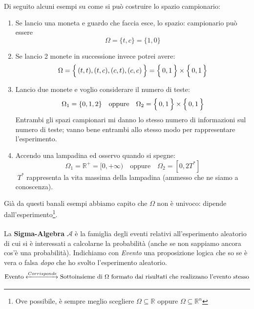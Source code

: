 \begin{esempio}
Di seguito alcuni esempi su come si può costruire lo spazio campionario:
\begin{enumerate}
    \item  Se lancio una moneta e guardo che faccia esce, lo spazio:
    campionario può essere \[\Omega = \{t, c\} = \{1, 0\}\]
    \item Se lancio 2 monete in successione invece potrei avere: 
    \[\Omega = \Bigl\{\,(t, t), (t, c), (c, t), (c, c)\,\Bigr\} = \Bigl\{\,0, 1\,\Bigr\} \times \Bigl\{\,0, 1\,\Bigr\}\]
    \item Lancio due monete e voglio considerare il numero di teste:
    \[\Omega_1 = \{0, 1, 2\} \quad \text{oppure} \quad \Omega_2 = \Bigl\{\,0, 1\,\Bigr\} \times \Bigl\{\,0, 1\,\Bigr\}\] 
    Entrambi gli spazi campionari mi danno lo stesso numero di informazioni sul numero di teste; vanno bene entrambi allo stesso modo per rappresentare l'esperimento.
    \item Accendo una lampadina ed osservo quando si spegne:
    \[\Omega_1 = \mathbb{R}^+ = [0, +\infty) \quad \text{oppure} \quad \Omega_2 = [0, 2T^*]\]
    $\;T^*$ rappresenta la vita massima della lampadina (ammesso che ne siamo a conoscenza).
\end{enumerate}
\end{esempio}
Già da questi banali esempi abbiamo capito che $\Omega$ non è univoco: dipende dall'esperimento\footnote{Ove possibile, è sempre meglio scegliere $\Omega \subseteq \mathbb{R}$ oppure $\Omega \subseteq \mathbb{R}^n$}.\\
\\
La \textbf{Sigma-Algebra} $\mathcal{A}$ è la famiglia degli eventi relativi all'esperimento aleatorio di cui si è interessati a calcolarne la probabilità (anche se non sappiamo ancora cos'è una probabilità). Indichiamo con \textit{Evento} una proposizione logica che so se è vera o falsa \textit{dopo} che ho svolto l'esperimento aleatorio.
\[\text{Evento} \xleftrightarrow{Corrisponde} \text{Sottoinsieme di }\Omega \text{ formato dai risultati che realizzano l'evento stesso}\]

